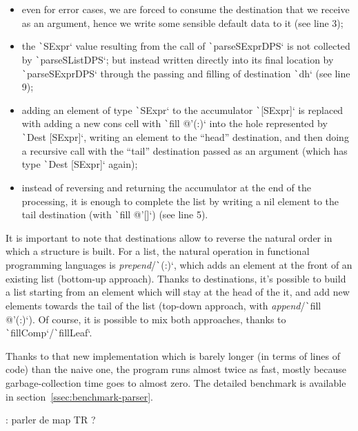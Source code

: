 \documentclass[english]{jflart}
\newcommand{\TODO}[1]{{\color{red}\large #1}}
\begin{document}
\begin{itemize}
  \item even for error cases, we are forced to consume the destination that we receive as an argument, hence we write some sensible default data to it (see line 3);
  \item the \texttt`SExpr` value resulting from the call of \texttt`parseSExprDPS` is not collected by \texttt`parseSListDPS`; but instead written directly into its final location by \texttt`parseSExprDPS` through the passing and filling of destination \texttt`dh` (see line 9);
  \item adding an element of type \texttt`SExpr` to the accumulator \texttt`[SExpr]` is replaced with adding a new cons cell with \texttt`fill @'(:)` into the hole represented by \texttt`Dest [SExpr]`, writing an element to the ``head'' destination, and then doing a recursive call with the ``tail'' destination passed as an argument (which has type \texttt`Dest [SExpr]` again);
  \item instead of reversing and returning the accumulator at the end of the processing, it is enough to complete the list by writing a nil element to the tail destination (with \texttt`fill @'[]`) (see line 5).
\end{itemize}

It is important to note that destinations allow to reverse the natural order in which a structure is built. For a list, the natural operation in functional programming languages is \emph{prepend}/\texttt`(:)`, which adds an element at the front of an existing list (bottom-up approach). Thanks to destinations, it's possible to build a list starting from an element which will stay at the head of the it, and add new elements towards the tail of the list (top-down approach, with \emph{append}/\texttt`fill @'(:)`). Of course, it is possible to mix both approaches, thanks to \texttt`fillComp`/\texttt`fillLeaf`.

Thanks to that new implementation which is barely longer (in terms of lines of code) than the naive one, the program runs almost twice as fast, mostly because garbage-collection time goes to almost zero. The detailed benchmark is available in section~\ref{ssec:benchmark-parser}.

\TODO{: parler de map TR ?}\\
\end{document}
